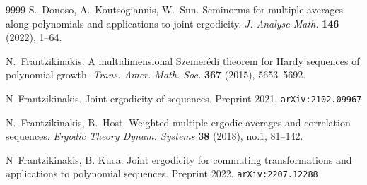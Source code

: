 \documentclass[11pt]{amsart}
\theoremstyle{definition}
\begin{document}
\begin{thebibliography}{9999}
		 S.~Donoso, A.~Koutsogiannis, W.~Sun.
	Seminorms for multiple averages along polynomials and applications to joint ergodicity.
	{\em J. Analyse Math.} {\bf 146} (2022),  1--64.
	




	
	N.~Frantzikinakis. A multidimensional Szemer\'edi theorem for Hardy sequences of polynomial growth.
	{\it Trans. Amer.
		Math. Soc.}   {\bf  367}  (2015), 5653--5692.
	
	
	
	
	 N~Frantzikinakis. Joint ergodicity of sequences. Preprint 2021, \texttt{arXiv:2102.09967}
	
	N.~Frantzikinakis,   B.~Host. Weighted multiple ergodic averages and correlation sequences.
	{\em Ergodic
		Theory Dynam. Systems} \textbf{38} (2018),   no.1,  81--142.
	
	
	
	
	

	 N~Frantzikinakis, B. Kuca. Joint ergodicity for commuting transformations and applications to polynomial sequences. Preprint 2022, \texttt{arXiv:2207.12288}	
	
	

\end{thebibliography}
\end{document}
